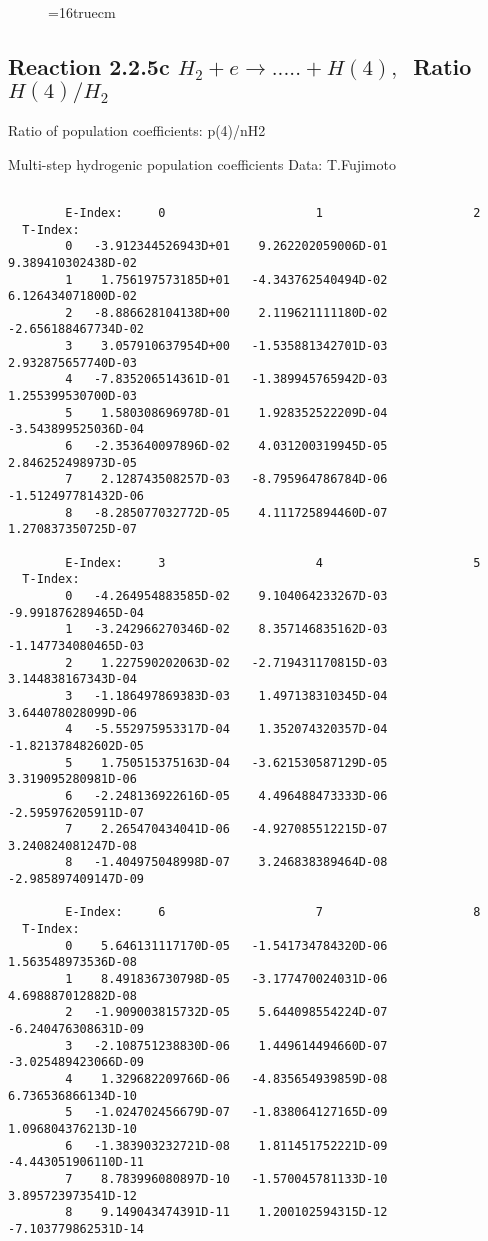 \documentclass[12pt]{article}
\begin{document}
\begin{figure} \label{2.2.5b}
\epsfxsize=16truecm
\end{figure}
\newpage

\subsection{
Reaction 2.2.5c  $H_2 + e \rightarrow .....+H(4)   , \  $
Ratio $H(4)/H_2 $
}

 Ratio of population coefficients: p(4)/nH2

 Multi-step hydrogenic population coefficients
 Data: T.Fujimoto

\begin{small}\begin{verbatim}

        E-Index:     0                     1                     2
  T-Index:
        0   -3.912344526943D+01    9.262202059006D-01    9.389410302438D-02
        1    1.756197573185D+01   -4.343762540494D-02    6.126434071800D-02
        2   -8.886628104138D+00    2.119621111180D-02   -2.656188467734D-02
        3    3.057910637954D+00   -1.535881342701D-03    2.932875657740D-03
        4   -7.835206514361D-01   -1.389945765942D-03    1.255399530700D-03
        5    1.580308696978D-01    1.928352522209D-04   -3.543899525036D-04
        6   -2.353640097896D-02    4.031200319945D-05    2.846252498973D-05
        7    2.128743508257D-03   -8.795964786784D-06   -1.512497781432D-06
        8   -8.285077032772D-05    4.111725894460D-07    1.270837350725D-07

        E-Index:     3                     4                     5
  T-Index:
        0   -4.264954883585D-02    9.104064233267D-03   -9.991876289465D-04
        1   -3.242966270346D-02    8.357146835162D-03   -1.147734080465D-03
        2    1.227590202063D-02   -2.719431170815D-03    3.144838167343D-04
        3   -1.186497869383D-03    1.497138310345D-04    3.644078028099D-06
        4   -5.552975953317D-04    1.352074320357D-04   -1.821378482602D-05
        5    1.750515375163D-04   -3.621530587129D-05    3.319095280981D-06
        6   -2.248136922616D-05    4.496488473333D-06   -2.595976205911D-07
        7    2.265470434041D-06   -4.927085512215D-07    3.240824081247D-08
        8   -1.404975048998D-07    3.246838389464D-08   -2.985897409147D-09

        E-Index:     6                     7                     8
  T-Index:
        0    5.646131117170D-05   -1.541734784320D-06    1.563548973536D-08
        1    8.491836730798D-05   -3.177470024031D-06    4.698887012882D-08
        2   -1.909003815732D-05    5.644098554224D-07   -6.240476308631D-09
        3   -2.108751238830D-06    1.449614494660D-07   -3.025489423066D-09
        4    1.329682209766D-06   -4.835654939859D-08    6.736536866134D-10
        5   -1.024702456679D-07   -1.838064127165D-09    1.096804376213D-10
        6   -1.383903232721D-08    1.811451752221D-09   -4.443051906110D-11
        7    8.783996080897D-10   -1.570045781133D-10    3.895723973541D-12
        8    9.149043474391D-11    1.200102594315D-12   -7.103779862531D-14


\end{verbatim}
\end{small}
\end{document}
